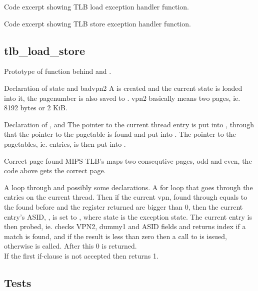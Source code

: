 {Code excerpt showing TLB load exception handler function.}

{Code excerpt showing TLB store exception handler function.}


\subsection{tlb\_load\_store}
    {Prototype of function behind  and
                          .}

    {Declaration of state and badvpn2}
A  is created and the current state is loaded
into it, the pagenumber is also saved to . vpn2
basically means two pages, ie. 8192 bytes or 2 KiB.


    {Declaration of ,  and }
The pointer to the current thread entry is put into , through
that the pointer to the pagetable is found and put into . The
pointer to the pagetables, ie. entries, is then put into .

    {Correct page found}
MIPS TLB's maps two consequtive pages, odd and even, the code above gets the
correct page.

    {A loop through  and possibly some declarations.}
A for loop that goes through the entries on the current thread. Then if the
current vpn, found through  equals to the 
found before and the register returned are bigger than 0, then the current entry's ASID,
, is set to , where state is the
exception state. The current entry is then probed, ie. checks VPN2, dummy1 and
ASID fields and returns index if a match is found, and if the result is less than
zero then a call to  is issued, otherwise
 is called. After this 0 is returned. \\
If the first if-clause is not accepted then 
returns 1.
\subsection{Tests}

